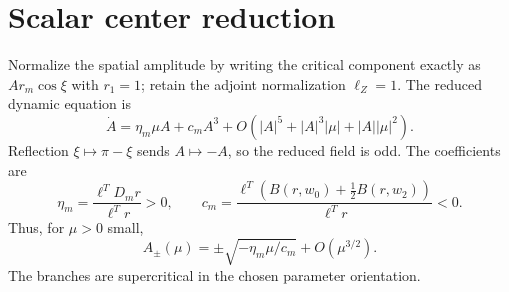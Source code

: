 \section*{Scalar center reduction}
Normalize the spatial amplitude by writing the critical component exactly as
$A r_m\cos\xi$ with $r_1=1$; retain the adjoint normalization $\ell_Z=1$.
The reduced dynamic equation is
\[
\dot A=\eta_m\mu A+c_mA^3
+O(|A|^5+|A|^3|\mu|+|A||\mu|^2).
\]
Reflection $\xi\mapsto\pi-\xi$ sends $A\mapsto-A$, so the reduced field is odd.
The coefficients are
\[
\eta_m=\frac{\ell^TD_mr}{\ell^Tr}>0,
\qquad
c_m=\frac{\ell^T(B(r,w_0)+\tfrac12B(r,w_2))}{\ell^Tr}<0.
\]
Thus, for $\mu>0$ small,
\[
A_\pm(\mu)=\pm\sqrt{-\eta_m\mu/c_m}+O(\mu^{3/2}).
\]
The branches are supercritical in the chosen parameter orientation.
